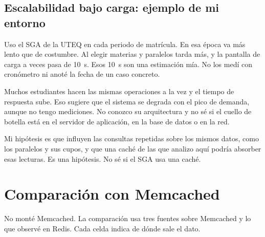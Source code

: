 \documentclass[11pt,a4paper]{article}
\begin{document}
\subsection{Escalabilidad bajo carga: ejemplo de mi entorno}

Uso el SGA de la UTEQ en cada periodo de matrícula. En esa época va más lento que de costumbre. Al elegir materias y paralelos tarda más, y la pantalla de carga a veces pasa de 10~s. Esos 10~s son una estimación mía. No los medí con cronómetro ni anoté la fecha de un caso concreto.

Muchos estudiantes hacen las mismas operaciones a la vez y el tiempo de respuesta sube. Eso sugiere que el sistema se degrada con el pico de demanda, aunque no tengo mediciones. No conozco su arquitectura y no sé si el cuello de botella está en el servidor de aplicación, en la base de datos o en la red.

Mi hipótesis es que influyen las consultas repetidas sobre los mismos datos, como los paralelos y sus cupos, y que una caché de las que analizo aquí podría absorber esas lecturas. Es una hipótesis. No sé si el SGA usa una caché.

\section{Comparación con Memcached}

No monté Memcached. La comparación usa tres fuentes sobre Memcached y lo que observé en Redis. Cada celda indica de dónde sale el dato.
\end{document}
